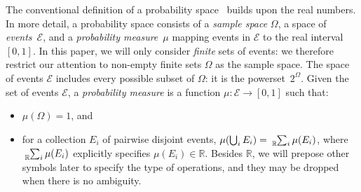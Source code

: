\documentclass{article}
\theoremstyle{remark}
\newcommand{\events}{\ensuremath{\mathcal{E}}}
\newcommand{\pmeas}{\ensuremath{\mu}}
\begin{document}
The conventional definition of a probability
space~\cite{Kolmogorov1950,Shafer1976,Griffiths2003,Swart2013}
builds upon the real numbers. In more detail, a probability space
consists of a \emph{sample space} $\Omega$, a space of
\emph{events}~$\events$, and a \emph{probability measure}~$\pmeas$
mapping events in $\events$ to the real interval $[0,1]$. In this
paper, we will only consider \emph{finite} sets of events: we
therefore restrict our attention to non-empty finite sets $\Omega$ as
the sample space. The space of events $\events$ includes every
possible subset of $\Omega$: it is the powerset~$2^\Omega$. Given the
set of events $\events$, a \emph{probability measure} is a function
$\pmeas : \events \rightarrow [0,1]$ such that:
\begin{itemize}
\item $\pmeas(\Omega) = 1$, and 
\item for a collection $E_{i}$ of pairwise disjoint events, $\pmeas(\bigcup_{i}E_{i})=\tensor*[_{\mathbb{R}}]{\sum}{_{i}}\pmeas(E_{i})$,
where $\tensor*[_{\mathbb{R}}]{\sum}{_{i}}\pmeas(E_{i})$
explicitly specifies $\pmeas(E_{i})\in\mathbb{R}$. Besides $\mathbb{R}$, we will
prepose other symbols later to specify the type of operations, and they may be
dropped when there is no ambiguity.
\end{itemize}
\end{document}

